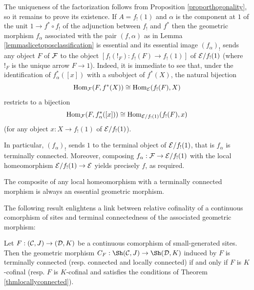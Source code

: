 \documentclass[a4paper,12pt]{article}
\begin{document}
\begin{proofs}
The uniqueness of the factorization follows from Proposition \ref{proporthogonality}, so it remains to prove its existence. 
If $A=f_{!}(1)$ and $\alpha$ is the component at $1$ of the unit $1\to f^{\ast}\circ f_{!}$ of the adjunction between $f_{!}$ and $f^{\ast}$ then the geometric morphism $f_{\alpha}$ associated with the pair $(f, \alpha)$ as in Lemma \ref{lemmaslicetoposclassification} is essential and its essential image $(f_{\alpha})_{!}$ sends any object $F$ of $\cal F$ to the object $[f_{!}(!_{F}):f_{!}(F)\to f_{!}(1)]$ of ${\cal E}\slash f_{!}(1)$ (where $!_{F}$ is the unique arrow $F\to 1$). Indeed, it is immediate to see that, under the identification of $f_{\alpha}^{\ast}([x])$ with a subobject of $f^{\ast}(X)$, the natural bijection
\[
\textup{Hom}_{\cal F}(F, f^{\ast}(X))\cong \textup{Hom}_{\cal E}(f_{!}(F), X) 
\]
restricts to a bijection 
\[
\textup{Hom}_{\cal F}(F, f_{\alpha}^{\ast}([x]))\cong \textup{Hom}_{{\cal E}\slash f_{!}(1)}(f_{!}(F), x)
\]
(for any object $x:X\to f_{!}(1)$ of ${\cal E}\slash f_{!}(1)$).  

In particular, $(f_{\alpha})_{!}$ sends $1$ to the terminal object of ${\cal E}\slash f_{!}(1)$, that is $f_{\alpha}$ is terminally connected.  
Moreover, composing $f_{\alpha}:{\cal F}\to {\cal E}\slash f_{!}(1)$ with the local homeomorphism ${\cal E}\slash f_{!}(1) \to {\cal E}$ yields precisely $f$, as required.	
\end{proofs}

\begin{remark}
	The composite of any local homeomorphism with a terminally connected morphism is always an essential geometric morphism.
\end{remark}

The following result enlightens a link between relative cofinality of a continuous comorphism of sites and terminal connectedness of the associated geometric morphism: 

\begin{proposition}\label{proplinkterminallyconnected}
	Let $F:({\cal C}, J)\to ({\cal D}, K)$ be a continuous comorphism of small-generated sites. Then the geometric morphism $C_{F}:\Sh({\cal C}, J)\to \Sh({\cal D}, K)$ induced by $F$ is terminally connected (resp. connected and locally connected) if and only if $F$ is $K$-cofinal (resp. $F$ is $K$-cofinal and satisfies the conditions of Theorem \ref{thmlocallyconnected}).
\end{proposition}
\end{document}
